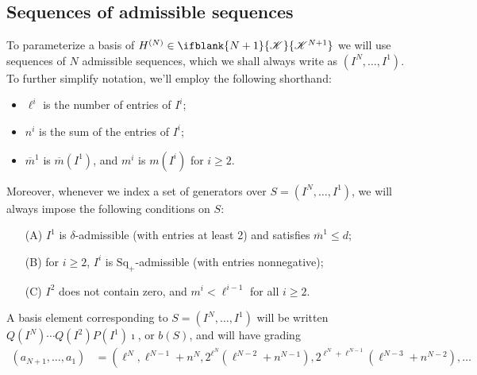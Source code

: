 \documentclass[10pt]{article}
\newcommand{\LL}[1]{\ifblank{#1}{\scrK}{\scrK^{#1}}}
\renewcommand{\Q}{Q}
\newcommand{\SqShift}{\Sq_{+}}
\newcommand{\Sq}{\mathrm{Sq}}
\newcommand{\minDim}{m}
\newcommand{\minDimP}{\overline{m}}
\begin{document}
\begin{SequenceOfSequencesIntro}
\subsection{Sequences of admissible sequences}
To parameterize a basis of $H^{(N)}\in\LL{N+1}$ we will use sequences of $N$ admissible sequences, which we shall always write as $(I^N,\ldots,I^1)$. To further simplify notation, we'll employ the following shorthand:
\begin{itemize}
\squishlist
\setlength{\parindent}{.25in}
\item $\ell^i$ is the number of entries of $I^i$;
\item $n^i$ is the sum of the entries of $I^i$;
\item $\minDimP^1$ is $\minDimP(I^1)$, and $\minDim^i$ is $\minDim(I^i)$ for $i\geq2$.
\end{itemize}
Moreover, whenever we index a set of generators over $S=(I^N,\ldots,I^1)$, we will always impose the following conditions on $S$:
\begin{enumerate}[A)]
\squishlist
\setlength{\parindent}{.25in}
\item[\textup{(A)}] $I^1$ is $\delta$-admissible (with entries at least 2) and satisfies $\minDimP^1\leq d$;
\item[\textup{(B)}] for $i\geq2$, $I^i$ is $\SqShift$-admissible (with entries nonnegative);
\item[\textup{(C)}] $I^2$ does not contain zero, and $\minDim^i<\ell^{i-1}$ for all $i\geq2$.
\end{enumerate}
A basis element corresponding to $S=(I^N,\ldots,I^1)$ will be written $\Q(I^N)\cdots \Q(I^2)P(I^1)\imath$, or $b(S)$, and will have grading%
\begin{align*}
 (a_{N+1},\ldots,a_1) &= \left( \ell^N,\ell^{N-1}+n^N,2^{\ell^N}\!\left(\ell^{N-2}+n^{N-1}\right),2^{\ell^N+\ell^{N-1}}\!\left(\ell^{N-3}+n^{N-2}\right),\ldots \right.\\

\end{align*}
\end{SequenceOfSequencesIntro}
\end{document}
